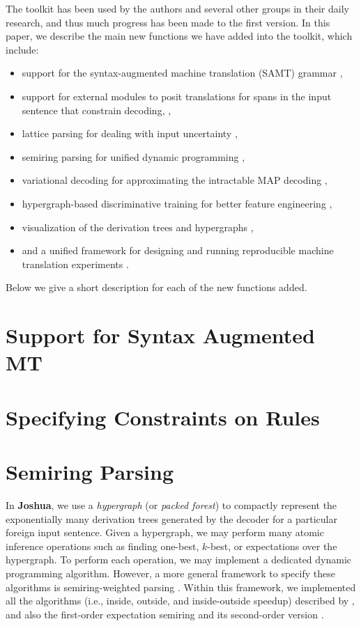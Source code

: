 \documentclass[11pt]{article}
\newcommand{\joshua}{\textbf{Joshua}\xspace}
\begin{document}
The toolkit has been used by the authors and several
other groups in their daily research, and thus much progress has
been made to the first version. 
In this paper, we describe the main new functions we have added into the 
toolkit, which include: 
\begin{itemize}
\item
support for the syntax-augmented machine translation (SAMT) grammar \cite{samt2006},
\item
support for external modules to posit translations for spans in the input sentence that constrain decoding,    \cite{PBML-2010-Josua-transliteration},  
\item
lattice parsing for dealing with input uncertainty \cite{dyer-muresan-resnik:2008:ACLMain},
\item
semiring parsing for unified dynamic programming \cite{li-eisner:2009:EMNLP} , 
\item
variational decoding for approximating the intractable MAP decoding \cite{variational-decoding-acl09},
\item
hypergraph-based discriminative training for better feature engineering \cite{zhifei-forest-reranking-galebook}, 
\item
visualization of the derivation trees and hypergraphs \cite{PBML-2010-Josua-visualization}, 
\item
and a unified framework for designing and running reproducible machine translation experiments \cite{Schwartz-wmt10-pipline}.
\end{itemize}
Below we give a short description for each of the new functions added.


\section{Support for Syntax Augmented MT}


\section{Specifying Constraints on Rules}

\section{Semiring Parsing}

In \joshua, we use a {\em hypergraph} (or {\em packed forest}) to compactly 
represent the exponentially many derivation trees generated by the decoder for a 
particular foreign input sentence.
Given a hypergraph, we may perform many atomic inference operations
such as finding one-best, $k$-best, or expectations over the hypergraph.
To perform each operation, we may implement a dedicated dynamic programming algorithm.
However, a more general framework to specify these algorithms is semiring-weighted parsing \cite{semiringparsing}.
Within this framework, we implemented all the algorithms (i.e.,
inside, outside, and inside-outside speedup) described by ,
and also the first-order expectation semiring \cite{eisner-expectation-semiring} and its
second-order version \cite{li-eisner:2009:EMNLP}.
\end{document}
